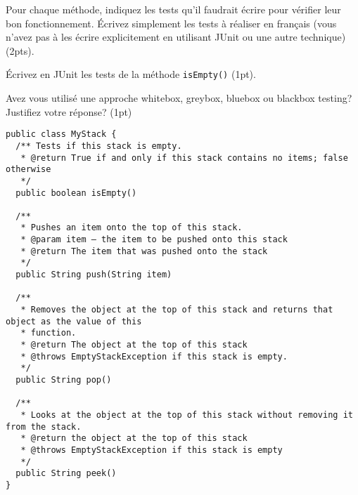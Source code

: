 \documentclass[10pt]{article}\usepackage[nu]{esial}
\begin{document}
\Question Pour chaque méthode, indiquez les tests qu'il faudrait écrire pour
vérifier leur bon fonctionnement. Écrivez simplement les tests à réaliser en
français (vous n'avez pas à les écrire explicitement en utilisant JUnit ou une
autre technique) (2pts).

\Question Écrivez en JUnit les tests de la méthode \texttt{isEmpty()} (1pt).

\Question Avez vous utilisé une approche whitebox, greybox, bluebox ou blackbox
testing? Justifiez votre réponse? (1pt)

\begin{Verbatim}
public class MyStack {
  /** Tests if this stack is empty.
   * @return True if and only if this stack contains no items; false otherwise
   */
  public boolean isEmpty()

  /**
   * Pushes an item onto the top of this stack.
   * @param item – the item to be pushed onto this stack
   * @return The item that was pushed onto the stack
   */
  public String push(String item)

  /**
   * Removes the object at the top of this stack and returns that object as the value of this
   * function.
   * @return The object at the top of this stack
   * @throws EmptyStackException if this stack is empty.
   */
  public String pop()

  /**
   * Looks at the object at the top of this stack without removing it from the stack.
   * @return the object at the top of this stack
   * @throws EmptyStackException if this stack is empty
   */
  public String peek()
}
\end{Verbatim} 
\end{document}
